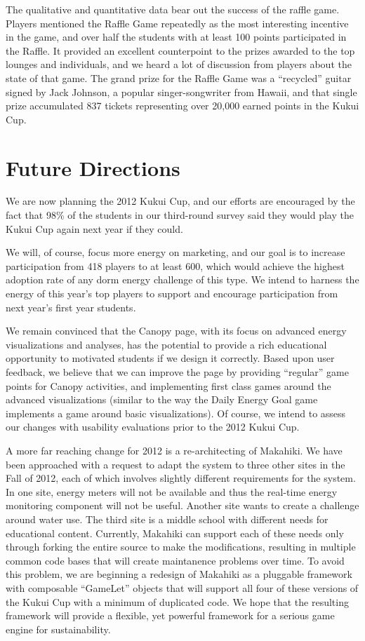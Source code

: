 \documentclass{acm_proc_article-sp}
\begin{document}
The qualitative and quantitative data bear out the success of the raffle game.  Players mentioned the Raffle Game repeatedly as the most interesting incentive in the game, and over half the students with at least 100 points participated in the Raffle.   It provided an excellent counterpoint to the prizes awarded to the top lounges and individuals, and we heard a lot of discussion from players about the state of that game.   The grand prize for the Raffle Game was a ``recycled'' guitar signed by Jack Johnson, a popular singer-songwriter from Hawaii, and that single prize accumulated 837 tickets representing over 20,000 earned points in the Kukui Cup.


\section{Future Directions}

We are now planning the 2012 Kukui Cup, and our efforts are encouraged
by the fact that 98\% of the students in our third-round survey said they
would play the Kukui Cup again next year if they could.

We will, of course, focus more energy on marketing, and our goal is to
increase participation from 418 players to at least 600, which would
achieve the highest adoption rate of any dorm energy challenge of this
type.  We intend to harness the energy of this year's top players to
support and encourage participation from next year's first year students.

We remain convinced that the Canopy page, with its focus on advanced energy
visualizations and analyses, has the potential to provide a rich
educational opportunity to motivated students if we design it
correctly.  Based upon user feedback, we believe that we can improve the
page by providing ``regular'' game points for Canopy activities, and
implementing first class games around the advanced visualizations (similar
to the way the Daily Energy Goal game implements a game around basic
visualizations).  Of course, we intend to assess our changes with usability
evaluations prior to the 2012 Kukui Cup.

A more far reaching change for 2012 is a re-architecting of Makahiki.  We
have been approached with a request to adapt the system to three other
sites in the Fall of 2012, each of which involves slightly different
requirements for the system. In one site, energy meters will not be
available and thus the real-time energy monitoring component will not be
useful. Another site wants to create a challenge around water use.  The
third site is a middle school with different needs for educational content.
Currently, Makahiki can support each of these needs only through forking
the entire source to make the modifications, resulting in multiple common
code bases that will create maintanence problems over time.  To avoid this
problem, we are beginning a redesign of Makahiki as a pluggable framework
with composable ``GameLet'' objects that will support all four of these versions of
the Kukui Cup with a minimum of duplicated code.  We hope that the
resulting framework will provide a flexible, yet powerful framework for a
serious game engine for sustainability.
\end{document}
